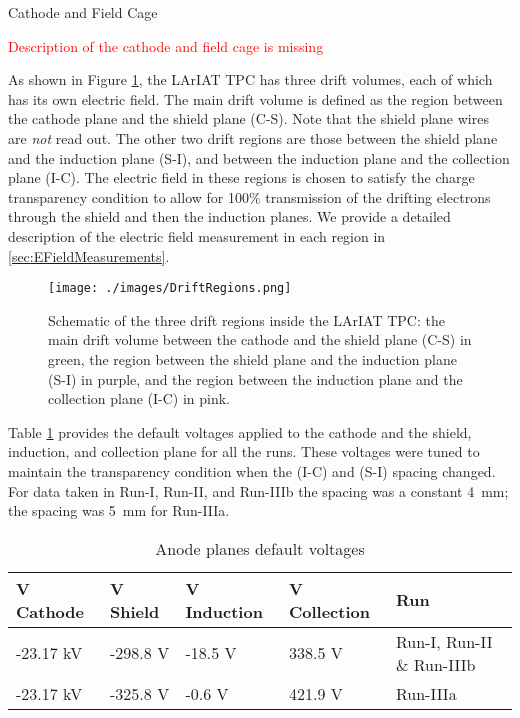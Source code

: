 \begin{subsubsection}{Cathode and Field Cage}\label{sec:FieldCage}

\textcolor{red}{Description of the cathode and field cage is missing}

As shown in Figure \ref{fig:driftregions}, the LArIAT TPC has three drift volumes, each of which has its own electric field. The main drift volume is defined as the region between the cathode plane and the shield plane (C-S). Note that the shield plane wires are \emph{not} read out. The other two drift regions are those between the shield plane and the induction plane (S-I), and between the induction plane and the collection plane (I-C). The electric field in these regions is chosen to satisfy the charge transparency condition to allow for 100$\%$ transmission of the drifting electrons through the shield and then the induction planes. We provide a detailed description of the electric field measurement in each region in \ref{sec:EFieldMeasurements}.

\begin{figure}[htb]
\centering
\texttt{[image: ./images/DriftRegions.png]}\\
\caption{Schematic of the three drift regions inside the LArIAT TPC: the main drift volume between the cathode and the shield plane (C-S) in green, the region between the shield plane and the induction plane (S-I) in purple, and the region between the induction plane and the collection plane (I-C) in pink.}
\label{fig:driftregions}
\end{figure}

Table \ref{tab:voltages} provides the default voltages applied to the cathode and the shield, induction, and collection plane for all the runs. These voltages were tuned to maintain the transparency condition when the (I-C) and (S-I) spacing changed. For data taken in Run-I, Run-II, and Run-IIIb the spacing was a constant 4~mm; the spacing was 5~mm for Run-IIIa. 

\begin{table}[htpb]
\centering
\caption{Anode planes default voltages}
\label{tab:voltages}
\begin{tabular}{lllll}
\hline
\multicolumn{1}{|l|}{V Cathode} & 
\multicolumn{1}{|l|}{V Shield} & \multicolumn{1}{l|}{V Induction} & \multicolumn{1}{l|}{V Collection} & \multicolumn{1}{|l|}{Run} \\ \hline
\multicolumn{1}{|l|}{-23.17 kV} &
\multicolumn{1}{|l|}{-298.8 V} & \multicolumn{1}{l|}{-18.5 V}      & \multicolumn{1}{l|}{338.5 V} & \multicolumn{1}{|l|}{Run-I, Run-II \& Run-IIIb}      \\ \hline
\multicolumn{1}{|l|}{-23.17 kV} & 
\multicolumn{1}{|l|}{-325.8 V} & \multicolumn{1}{l|}{-0.6 V}      & \multicolumn{1}{l|}{421.9 V} & \multicolumn{1}{|l|}{Run-IIIa}      \\ \hline


\end{tabular}
\end{table}
\end{subsubsection}
